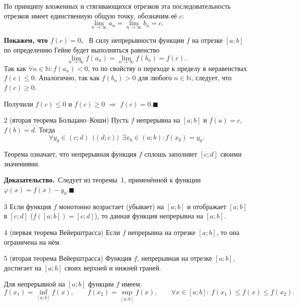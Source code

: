 \documentclass[a4paper,11pt]{article}
\newcommand{\lead}[1]{\textbf{\color{leadcol}#1}\ }
\newcommand{\dok}{\textbf{Доказательство.}\ }
\newcommand{\qedr}{\hfill$\blacksquare$}
\begin{document}
По принципу вложенных и стягивающихся отрезков эта последовательность отрезков имеет единственную
общую точку, обозначим её $c$:
\[
  \lim_{n \to \infty} a_n = \lim_{n \to \infty} b_n = c.
\]

\lead{Покажем, что $f(c) = 0$.} В силу непрерывности функции $f$ на отрезке $[a; b]$ по определению
Гейне будет выполняться равенство
\[
  \lim_{n \to \infty} f(a_n) = \lim_{n \to \infty} f(b_n) = f(c).
\]
Так как $\forall n \in \mathbb{N}\colon f(a_n) < 0$, то по свойству о переходе к пределу в неравенствах
$f(c) \le 0$. Аналогично, так как $f(b_n) > 0$ для любого $n \in \mathbb{N}$, следует, что $f(c) \ge 0$.

Получили $f(c) \le 0$ и $f(c) \ge 0$ $\Longrightarrow$ $f(c) = 0$.\qedr

\begin{teor}{2 (вторая теорема Больцано--Коши)}
  Пусть $f$ непрерывна на $[a; b]$ и $f(a) = c$, $f(b) = d$. Тогда
  \[
    \forall y_0 \in (c; d)\ \ \bigl((d; c)\bigr)\ \ \exists x_0 \in (a; b)\colon f(x_0) = y_0.
  \]
\end{teor}

Теорема означает, что непрерывная функция $f$ сплошь заполняет $[c; d]$ своими значениями.

\dok Следует из теоремы~1, применённой к функции $\varphi(x) = f(x) - y_0$.\qedr

\begin{teor}{3}
  Если функция $f$ монотонно возрастает (убывает) на $[a; b]$ и отображает $[a; b]$ в $[c; d]$
  ($f([a; b]) = [c; d]$), то данная функция непрерывна на $[a; b]$.
\end{teor}

\begin{teor}{4 (первая теорема Вейерштрасса)}
  Если $f$ непрерывна на отрезке $[a; b]$, то она ограничена на нём.
\end{teor}

\begin{teor}{5 (вторая теорема Вейерштрасса)}
  Функция $f$, непрерывная на отрезке $[a; b]$, достигает на $[a; b]$ своих верхней и нижней граней.
\end{teor}

Для непрерывной на $[a; b]$ функции $f$ имеем:
\[
  f(x_1) = \inf_{[a; b]} f(x), \qquad f(x_2) = \sup_{[a; b]} f(x), \qquad
  \forall x \in [a; b]\colon\ f(x_1) \le f(x) \le f(x_2).
\]

\begin{center}
\end{center}
\end{document}

